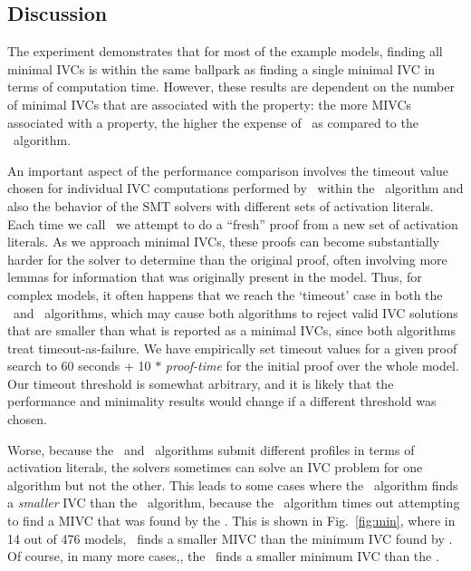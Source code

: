 \subsection {Discussion}
\label{sec:experiment-discussion}
The experiment demonstrates that for most of the example models, finding all minimal IVCs is within the same ballpark as finding a single minimal IVC in terms of computation time.  However, these results are dependent on the number of minimal IVCs that are associated with the property: the more MIVCs associated with a property, the higher the expense of \aivcalg\ as compared to the \ucbfalg\ algorithm.  

An important aspect of the performance comparison involves the timeout value chosen for individual IVC computations performed by \getivc\ within the \aivcalg\ algorithm and also the behavior of the SMT solvers with different sets of activation literals.  Each time we call \getivc\ we attempt to do a ``fresh'' proof from a new set of activation literals.  As we approach minimal IVCs, these proofs can become substantially harder for the solver to determine than the original proof, often involving more lemmas for information that was originally present in the model.  Thus, for complex models, it often happens that we reach the `timeout' case in both the \aivcalg\ and \ucbfalg\ algorithms, which may cause both algorithms to reject valid IVC solutions that are smaller than what is reported as a minimal IVCs, since both algorithms treat timeout-as-failure.  We have empirically set timeout values for a given proof search to 60 seconds + 10 $*$ {\em proof-time} for the initial proof over the whole model. Our timeout threshold is somewhat arbitrary, and it is likely that the performance and minimality results would change if a different threshold was chosen.

Worse, because the \ucbfalg\ and \aivcalg\ algorithms submit different profiles in terms of activation literals, the solvers sometimes can solve an IVC problem for one algorithm but not the other.  This leads to some cases where the \ucbfalg\ algorithm finds a {\em smaller} IVC than the \aivcalg\ algorithm, because the \aivcalg\ algorithm times out attempting to find a MIVC that was found by the \ucbfalg.  This is shown in Fig.~\ref{fig:min}, where in 14 out of 476 models, \ucbfalg\ finds a smaller MIVC than the minimum IVC found by \aivcalg.  Of course, in many more cases,, the \aivcalg\ finds a smaller minimum IVC than the \ucbfalg.  

